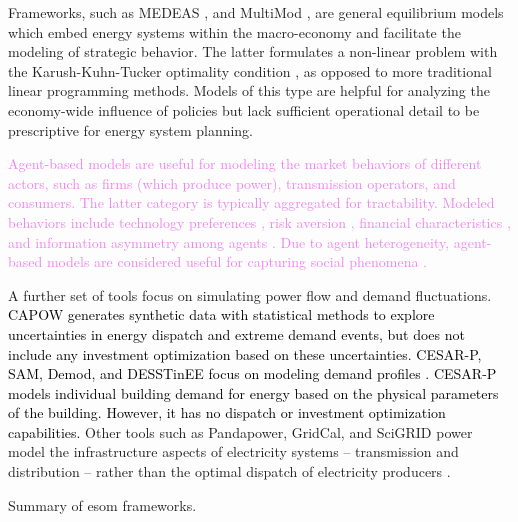 Frameworks, such as MEDEAS \cite{capellan-perez_medeas_2020}, and MultiMod
\cite{huppmann_market_2014}, are general equilibrium models which embed energy systems 
within the macro-economy and facilitate the modeling of strategic behavior. The latter 
formulates a non-linear problem with the Karush-Kuhn-Tucker optimality condition 
\cite{huppmann_market_2014}, as opposed to more traditional linear programming methods. 
Models of this type are helpful for analyzing the economy-wide influence of policies but 
lack sufficient operational detail to be prescriptive for energy system planning.

\textcolor{violet}{Agent-based models are useful for modeling the market behaviors of different actors, such as firms (which produce power), transmission operators, and consumers. The latter category is typically aggregated for tractability. Modeled behaviors include technology preferences \cite{anwar_modeling_2022, zade_quantifying_2020}, risk aversion \cite{anwar_modeling_2022}, financial characteristics \cite{anwar_modeling_2022, nitsch_economic_2021}, and information asymmetry among agents \cite{anwar_modeling_2022, nitsch_economic_2021}. Due to agent heterogeneity, agent-based models are considered useful for capturing social phenomena \cite{yue_review_2018,fattahi_systemic_2020}.}

A further set of tools focus on simulating power flow and demand fluctuations. 
\textcolor{black}{CAPOW \cite{su_open_2020} generates synthetic data with statistical 
methods to explore uncertainties in energy dispatch and extreme demand events, but does 
not include any investment optimization based on these uncertainties.}
\textcolor{black}{CESAR-P, SAM, Demod, and DESSTinEE focus on modeling demand profiles
\cite{leoniefierz_hues-platformcesar-p-core_2021,bosmann_shape_2015,barsanti_socio-technical_2021}. 
CESAR-P models individual building demand for energy based on the physical parameters of 
the building. However, it has no dispatch or investment optimization capabilities.} Other 
tools such as Pandapower, GridCal, and SciGRID power model the infrastructure aspects of 
electricity systems -- transmission and distribution -- rather than the optimal dispatch 
of electricity producers \cite{thurner_pandapower_2018, vera_gridcal_2022,
matke_structure_2017}.

\begin{table}
    \centering
    \caption{Summary of \ac{esom} frameworks.}
    \label{tab:esoms}
    \resizebox*{\textwidth}{0.95\textheight}{}
\end{table}

